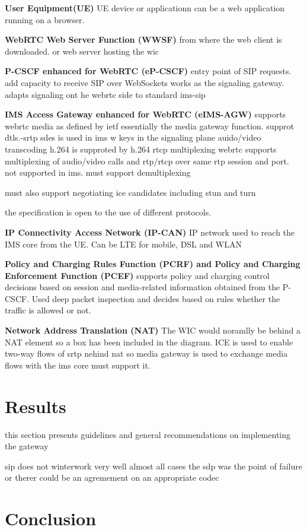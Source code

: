 \textbf{User Equipment(UE)}
UE device or applicationn can be a web application running on a browser.

\textbf{WebRTC Web Server Function (WWSF)}
from where the web client is downloaded.
or web server hosting the wic

\textbf{P-CSCF enhanced for WebRTC (eP-CSCF)}
entry point of SIP requests. add capacity to receive SIP over WebSockets
works as the signaling gateway. adapts signaling ont he webrtc side to standard ims-sip

\textbf{IMS Access Gateway enhanced for WebRTC (eIMS-AGW)}
supports webrtc media as defined by ietf
essentially the media gateway function.
supprot
dtls.-srtp    sdes is used in ims w keys in the signaling plane
auido/video transcoding  h.264 is supproted by h.264
rtcp multiplexing webrtc supports multiplexing of audio/video calls and rtp/rtcp over same rtp session and port. not supported in ims. must support demultiplexing

must also support negotiating ice candidates including stun and turn

the specification is open to the use of different protocols.

\textbf{IP Connectivity Access Network (IP-CAN)}
IP network used to reach the IMS core from the UE. Can be LTE for mobile, DSL and WLAN

\textbf{Policy and Charging Rules Function (PCRF) and Policy and Charging Enforcement Function (PCEF)}
supports policy and charging control decisions based on session and media-related information obtained from the P-CSCF.
Used deep packet inspection and decides based on rules whether the traffic is allowed or not.

\textbf{Network Address Translation (NAT)}
The WIC would noramlly be behind a NAT element so a box has been included in the diagram. ICE is used to enable two-way flows of srtp nehind nat so media gateway is used to exchange media flows with the ims core must support it.


\section{Results}
this section presents guidelines and general recommendations on implementing the gateway


sip does not winterwork very well
almost all cases the sdp was the point of failure
or therer could be an agremement on an appropriate codec

\section{Conclusion}
